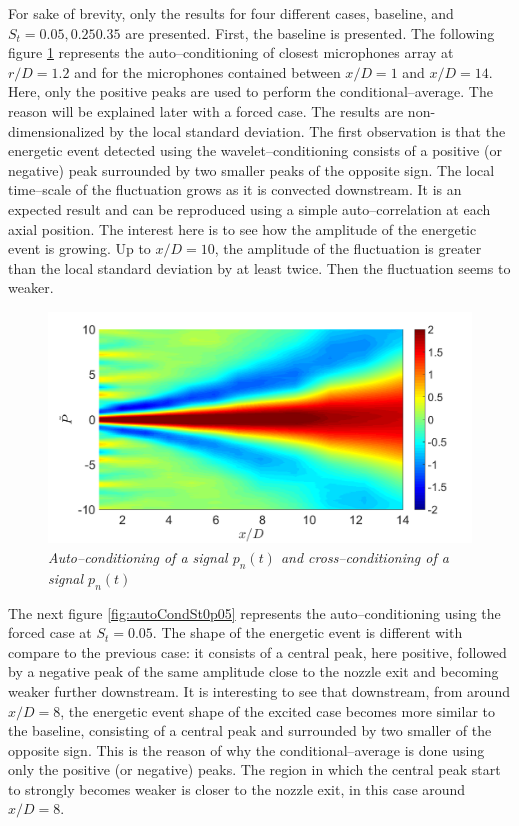 For sake of brevity, only the results for four different cases, baseline, and $S_t = 0.05, 0.25 0.35$ are presented. First, the baseline is presented. The following figure \ref{fig:autoCondSt0p00} represents the auto--conditioning of closest microphones array at $r/D = 1.2$ and for the microphones contained between $x/D=1$ and $x/D=14$. Here, only the positive peaks are used to perform the conditional--average. The reason will be explained later with a forced case. The results are non-dimensionalized by the local standard deviation. The first observation is that the energetic event detected using the wavelet--conditioning consists of a positive (or negative) peak surrounded by two smaller peaks of the opposite sign. The local time--scale of the fluctuation grows as it is convected downstream. It is an expected result and can be reproduced using a simple auto--correlation at each axial position. The interest here is to see how the amplitude of the energetic event is growing. Up to $x/D=10$, the amplitude of the fluctuation is greater than the local standard deviation by at least twice. Then the fluctuation seems to weaker. 

\begin{figure}
	\centering
	\includegraphics[width=1\textwidth]{Figures/conditioning/autoCondSt0p00.png}
	\caption{\textit{Auto--conditioning of a signal $p_n(t)$ and cross--conditioning of a signal $p_n(t)$}}
	\label{fig:autoCondSt0p00}
\end{figure}

The next figure \ref{fig:autoCondSt0p05} represents the auto--conditioning using the forced case at $S_t = 0.05$. The shape of the energetic event is different with compare to the previous case: it consists of a central peak, here positive, followed by a negative peak of the same amplitude close to the nozzle exit and becoming weaker further downstream. It is interesting to see that downstream, from around $x/D=8$, the energetic event shape of the excited case becomes more similar to the baseline, consisting of a central peak and surrounded by two smaller of the opposite sign. This is the reason of why the conditional--average is done using only the positive (or negative) peaks. The region in which the central peak start to strongly becomes weaker is closer to the nozzle exit, in this case around $x/D = 8$. 

